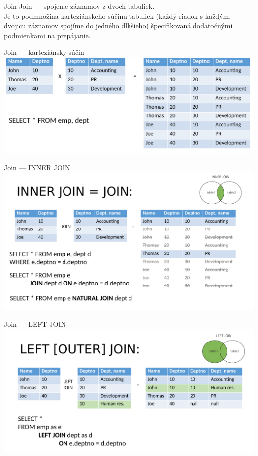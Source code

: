 \documentclass[12pt]{beamer}
\begin{document}
\begin{frame}{Join}
\alert{Join} --- spojenie záznamov z dvoch tabuliek.\\[3mm]

Je to podmnožina karteziánskeho súčinu tabuliek (každý riadok s každým, dvojicu záznamov spojíme do jedného dlhšieho)
špecifikovaná dodatočnými podmienkami na prepájanie.
\end{frame}

\begin{frame}{Join --- karteziánsky súčin}
\includegraphics[scale=.12]{join1}
\end{frame}

\begin{frame}{Join --- INNER JOIN}
\includegraphics[scale=.12]{join2}
\end{frame}

\begin{frame}{Join --- LEFT JOIN}
\includegraphics[scale=.12]{join3}
\end{frame}
\end{document}
